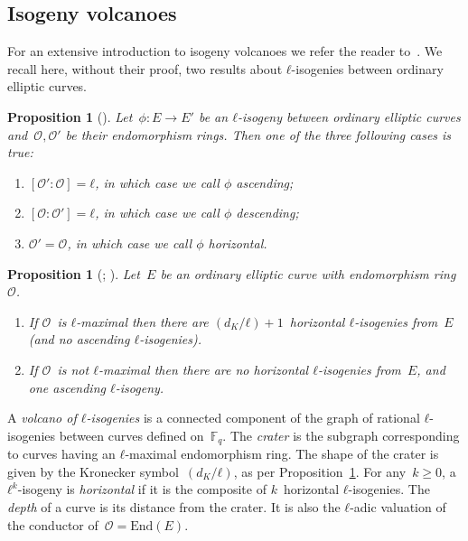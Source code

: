 \documentclass{lms}
\newtheorem{prop}[thm]{Proposition}
\begin{document}
\subsection{Isogeny volcanoes}

For an extensive introduction to isogeny volcanoes we refer the
reader to~\cite{sutherland2013isogeny}.  We recall here, without their
proof, two results about $ℓ$-isogenies between ordinary elliptic
curves.

\begin{prop}[{\cite[Proposition~21]{kohel}}] \label{prop:isogeny-asc-desc}
Let~$ϕ: E → E'$ be an $ℓ$-isogeny between ordinary elliptic curves
and~$\mathcal O, \mathcal O'$ be their endomorphism rings.
Then one of the three following cases is true:
\begin{enumerate}
\item $[\mathcal O':\mathcal O] = ℓ$,
in which case we call $ϕ$ \emph{ascending};
\item $[\mathcal O:\mathcal O'] = ℓ$,
in which case we call $ϕ$ \emph{descending};
\item $\mathcal O' = \mathcal O$,
in which case we call $ϕ$ \emph{horizontal}.
\end{enumerate}
\end{prop}
\begin{prop}[{\cite[Proposition~23]{kohel}; \cite[Lemma~6]{sutherland2013isogeny}}] \label{prop:isogeny-count}
Let~$E$ be an ordinary elliptic curve with endomorphism ring~$\mathcal O$.
\begin{enumerate}
\item If $\mathcal O$~is $ℓ$-maximal then
there are $(d_K/ℓ)+1$~horizontal $ℓ$-isogenies from~$E$
(and no ascending $ℓ$-isogenies).
\item If $\mathcal O$~is not $ℓ$-maximal then
there are no horizontal $ℓ$-isogenies from~$E$,
and one ascending $ℓ$-isogeny.
\end{enumerate}
\end{prop}

A \emph{volcano of $ℓ$-isogenies} is a connected component
of the graph of rational $ℓ$-isogenies between curves defined on~$\mathbb F_q$.
The \emph{crater} is the subgraph corresponding to curves
having an $ℓ$-maximal endomorphism ring.
The shape of the crater is given by the Kronecker symbol~$(d_K/ℓ)$,
as per Proposition~\ref{prop:isogeny-count}.
For any~$k ≥ 0$, a $ℓ^k$-isogeny is \emph{horizontal}
if it is the composite of $k$~horizontal $ℓ$-isogenies.
The \emph{depth} of a curve is its distance from the crater.
It is also the $ℓ$-adic valuation of the conductor
of~$\mathcal O = \mathrm{End}(E)$.
\end{document}
